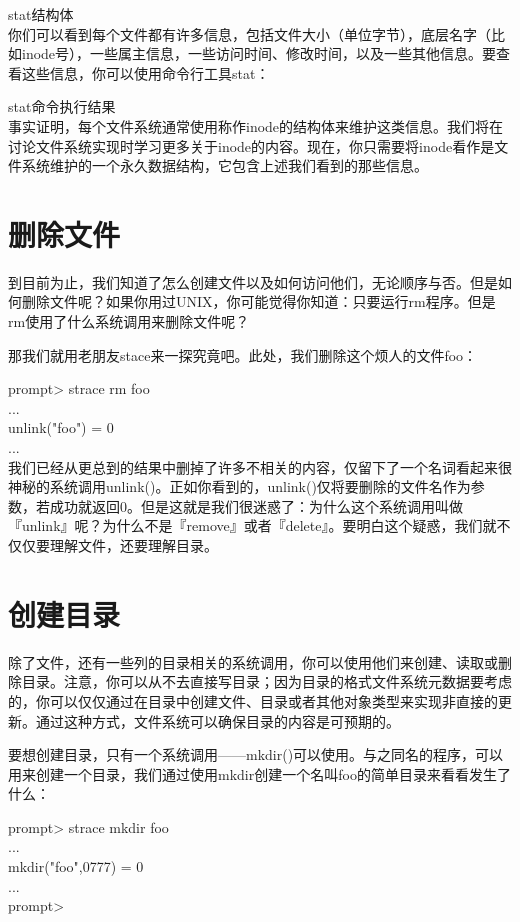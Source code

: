stat结构体\\

你们可以看到每个文件都有许多信息，包括文件大小（单位字节），底层名字（比如inode号），一些属主信息，一些访问时间、修改时间，以及一些其他信息。要查看这些信息，你可以使用命令行工具stat：

stat命令执行结果\\

事实证明，每个文件系统通常使用称作inode的结构体来维护这类信息。我们将在讨论文件系统实现时学习更多关于inode的内容。现在，你只需要将inode看作是文件系统维护的一个永久数据结构，它包含上述我们看到的那些信息。

\section{删除文件}
到目前为止，我们知道了怎么创建文件以及如何访问他们，无论顺序与否。但是如何删除文件呢？如果你用过UNIX，你可能觉得你知道：只要运行rm程序。但是rm使用了什么系统调用来删除文件呢？

那我们就用老朋友stace来一探究竟吧。此处，我们删除这个烦人的文件foo：

prompt> strace rm foo\\
...\\
unlink("foo")			= 0\\
...\\

我们已经从更总到的结果中删掉了许多不相关的内容，仅留下了一个名词看起来很神秘的系统调用unlink()。正如你看到的，unlink()仅将要删除的文件名作为参数，若成功就返回0。但是这就是我们很迷惑了：为什么这个系统调用叫做『unlink』呢？为什么不是『remove』或者『delete』。要明白这个疑惑，我们就不仅仅要理解文件，还要理解目录。

\section{创建目录}

除了文件，还有一些列的目录相关的系统调用，你可以使用他们来创建、读取或删除目录。注意，你可以从不去直接写目录；因为目录的格式文件系统元数据要考虑的，你可以仅仅通过在目录中创建文件、目录或者其他对象类型来实现非直接的更新。通过这种方式，文件系统可以确保目录的内容是可预期的。

要想创建目录，只有一个系统调用——mkdir()可以使用。与之同名的程序，可以用来创建一个目录，我们通过使用mkdir创建一个名叫foo的简单目录来看看发生了什么：

prompt> strace mkdir foo\\
...\\
mkdir("foo",0777)		= 0\\
...\\
prompt>\\

